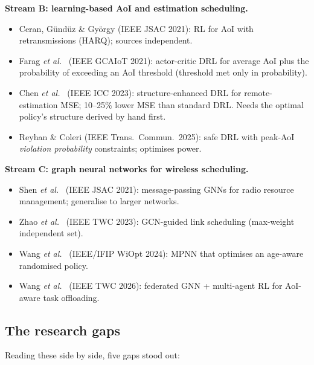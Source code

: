 \textbf{Stream B: learning-based AoI and estimation scheduling.}
\begin{itemize}
  \item Ceran, G\"und\"uz \& Gy\"orgy \cite{6} (IEEE JSAC 2021): RL for AoI with retransmissions (HARQ); sources
        independent.
  \item Farag \emph{et al.}\ \cite{7} (IEEE GCAIoT 2021): actor-critic DRL for average AoI plus the probability of
        exceeding an AoI threshold (threshold met only in probability).
  \item Chen \emph{et al.}\ \cite{8} (IEEE ICC 2023): structure-enhanced DRL for remote-estimation MSE; 10--25\% lower
        MSE than standard DRL. Needs the optimal policy's structure derived by hand first.
  \item Reyhan \& Coleri \cite{9} (IEEE Trans.\ Commun.\ 2025): safe DRL with peak-AoI \emph{violation probability}
        constraints; optimises power.
\end{itemize}

\textbf{Stream C: graph neural networks for wireless scheduling.}
\begin{itemize}
  \item Shen \emph{et al.}\ \cite{10} (IEEE JSAC 2021): message-passing GNNs for radio resource management; generalise
        to larger networks.
  \item Zhao \emph{et al.}\ \cite{11} (IEEE TWC 2023): GCN-guided link scheduling (max-weight independent set).
  \item Wang \emph{et al.}\ \cite{12} (IEEE/IFIP WiOpt 2024): MPNN that optimises an age-aware randomised policy.
  \item Wang \emph{et al.}\ \cite{13} (IEEE TWC 2026): federated GNN + multi-agent RL for AoI-aware task offloading.
\end{itemize}

\subsection{The research gaps}

Reading these side by side, five gaps stood out:

